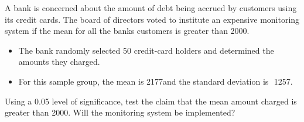 

 
 
 \item  A bank is concerned about the amount of debt being accrued by customers using its credit
 cards. The board of directors voted to institute an expensive monitoring system if the mean for all the banks customers is greater than 2000.
 \begin{itemize}
 	\item The bank randomly selected 50 credit-card holders and
 	determined the amounts they charged. 
 	\item For this sample group, the mean is 2177and the standard	deviation is  1257. 
 \end{itemize}
  Using a 0.05 level of significance, test the claim that the mean amount charged
 is greater than 2000. Will the monitoring system be implemented?
 